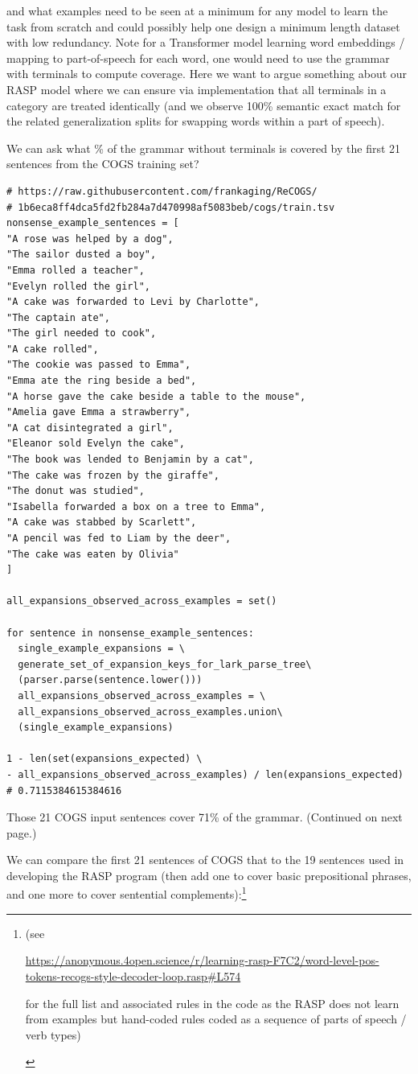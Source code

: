 \documentclass[11pt]{article}
\begin{document}
and what examples need to be seen at a minimum for any model to learn the task from scratch and could possibly help one design a minimum length dataset with low redundancy.
Note for a Transformer model learning word embeddings / mapping to part-of-speech for each word, one would need to use the grammar with terminals to compute coverage. Here we want to argue something about our RASP model where we can ensure via implementation that all terminals in a category are treated identically (and we observe 100\% semantic exact match for the related generalization splits for swapping words within a part of speech).


We can ask what \% of the grammar without terminals is covered by the first 21 sentences from the COGS training set?
\begin{tiny}
\begin{verbatim}
# https://raw.githubusercontent.com/frankaging/ReCOGS/
# 1b6eca8ff4dca5fd2fb284a7d470998af5083beb/cogs/train.tsv
nonsense_example_sentences = [
"A rose was helped by a dog",
"The sailor dusted a boy",
"Emma rolled a teacher",
"Evelyn rolled the girl",
"A cake was forwarded to Levi by Charlotte",
"The captain ate",
"The girl needed to cook",
"A cake rolled",
"The cookie was passed to Emma",
"Emma ate the ring beside a bed",
"A horse gave the cake beside a table to the mouse",
"Amelia gave Emma a strawberry",
"A cat disintegrated a girl",
"Eleanor sold Evelyn the cake",
"The book was lended to Benjamin by a cat",
"The cake was frozen by the giraffe",
"The donut was studied",
"Isabella forwarded a box on a tree to Emma",
"A cake was stabbed by Scarlett",
"A pencil was fed to Liam by the deer",
"The cake was eaten by Olivia"
]

all_expansions_observed_across_examples = set()

for sentence in nonsense_example_sentences:
  single_example_expansions = \
  generate_set_of_expansion_keys_for_lark_parse_tree\
  (parser.parse(sentence.lower()))
  all_expansions_observed_across_examples = \
  all_expansions_observed_across_examples.union\
  (single_example_expansions)

1 - len(set(expansions_expected) \
- all_expansions_observed_across_examples) / len(expansions_expected)
# 0.7115384615384616
\end{verbatim}
\end{tiny}
Those 21 COGS input sentences cover 71\% of the grammar. (Continued on next page.)

We can compare the first 21 sentences of COGS that to the 19 sentences used in developing the RASP program (then add one to cover basic prepositional phrases, and one more to cover sentential complements):\footnote{\begin{footnotesize}(see 

\href{https://anonymous.4open.science/r/learning-rasp-F7C2/word-level-pos-tokens-recogs-style-decoder-loop.rasp\#L574}{https://anonymous.4open.science/r/learning-rasp-F7C2/word-level-pos-tokens-recogs-style-decoder-loop.rasp\#L574}

for the full list and associated rules in the code as the RASP does not learn from examples but hand-coded rules coded as a sequence of parts of speech / verb types)\end{footnotesize}}
\end{document}
